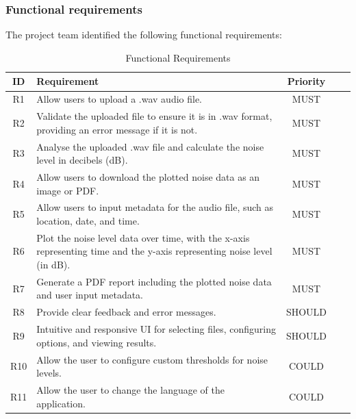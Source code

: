 \subsubsection{Functional requirements}
The project team identified the following functional requirements:
\begin{table}[H]
    \centering
    \begin{tabularx}{\textwidth}{|c|X|c|c|c|}
        \hline
        \textbf{ID} & \textbf{Requirement} & \textbf{Priority} \\
        \hline
        R1 & Allow users to upload a .wav audio file. & MUST \\
        \hline
        R2 & Validate the uploaded file to ensure it is in .wav format, providing an error message if it is not. & MUST \\
        \hline
        R3 & Analyse the uploaded .wav file and calculate the noise level in decibels (dB). & MUST \\
        \hline
        R4 & Allow users to download the plotted noise data as an image or PDF. & MUST \\
        \hline
        R5 & Allow users to input metadata for the audio file, such as location, date, and time. & MUST \\
        \hline
        R6 & Plot the noise level data over time, with the x-axis representing time and the y-axis representing noise level (in dB). & MUST \\
        \hline
        R7 & Generate a PDF report including the plotted noise data and user input metadata. & MUST \\
        \hline
        R8 & Provide clear feedback and error messages. & SHOULD \\
        \hline
        R9 & Intuitive and responsive UI for selecting files, configuring options, and viewing results. & SHOULD \\
        \hline
        R10 & Allow the user to configure custom thresholds for noise levels. & COULD \\
        \hline
        R11 & Allow the user to change the language of the application. & COULD \\
        \hline
    \end{tabularx}
    \caption{Functional Requirements}
    \label{table:functional_requirements}
\end{table}

